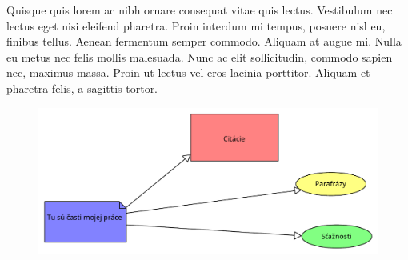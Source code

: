 \documentclass[10pt,twocolumn,twoside,slovak,a4paper]{article}
\begin{document}
Quisque quis lorem ac nibh ornare consequat vitae quis lectus. Vestibulum nec lectus eget nisi eleifend pharetra. Proin interdum mi tempus, posuere nisl eu, finibus tellus. Aenean fermentum semper commodo. Aliquam at augue mi. Nulla eu metus nec felis mollis malesuada. Nunc ac elit sollicitudin, commodo sapien nec, maximus massa. Proin ut lectus vel eros lacinia porttitor. Aliquam et pharetra felis, a sagittis tortor.




\begin{figure}
	\includegraphics[scale=0.4]{diagram horizontal.pdf}
\end{figure}




\newpage



\begin{figure}
	
\end{figure}
\end{document}
